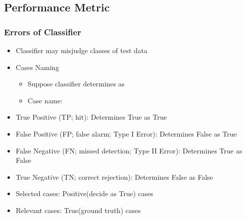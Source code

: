 \subsection{Performance Metric}

\subsubsection*{Errors of Classifier}
\begin{itemize}
    \item Classifier may misjudge classes of test data
    \item Cases Naming
    \begin{itemize}
        \item Suppose classifier determines  as 
        \item Case name: 
    \end{itemize}
    \item True Positive (TP; hit): Determines True as True
    \item False Positive (FP; false alarm; Type I Error): Determines False as True
    \item False Negative (FN; missed detection; Type II Error): Determines True as False
    \item True Negative (TN; correct rejection): Determines False as False
    \item Selected cases: Positive(decide as True) cases
    \item Relevant cases: True(ground truth) cases
\end{itemize}
\begin{figures}
\end{figures}

